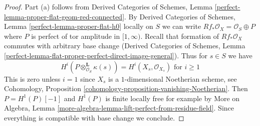 \documentclass[10pt,a4paper]{amsart}
\theoremstyle{plain}
\theoremstyle{definition}
\theoremstyle{remark}
\numberwithin{equation}{subsection}
\begin{document}
\begin{proof}
Part (a) follows from
Derived Categories of Schemes, Lemma
\ref{perfect-lemma-proper-flat-geom-red-connected}.
By Derived Categories of Schemes, Lemma
\ref{perfect-lemma-proper-flat-h0} locally on $S$
we can write $Rf_*\mathcal{O}_X = \mathcal{O}_S \oplus P$
where $P$ is perfect of tor amplitude in $[1, \infty)$.
Recall that formation of $Rf_*\mathcal{O}_X$ commutes
with arbitrary base change
(Derived Categories of Schemes, Lemma
\ref{perfect-lemma-flat-proper-perfect-direct-image-general}).
Thus for $s \in S$ we have
$$
H^i(P \otimes_{\mathcal{O}_S}^\mathbf{L} \kappa(s)) =
H^i(X_s, \mathcal{O}_{X_s})
\text{ for }i \geq 1
$$
This is zero unless $i = 1$ since $X_s$ is a $1$-dimensional
Noetherian scheme, see
Cohomology, Proposition \ref{cohomology-proposition-vanishing-Noetherian}.
Then $P = H^1(P)[-1]$ and $H^1(P)$ is finite locally free
for example by More on Algebra, Lemma
\ref{more-algebra-lemma-lift-perfect-from-residue-field}.
Since everything is compatible with base change we conclude.
\end{proof}
\end{document}
